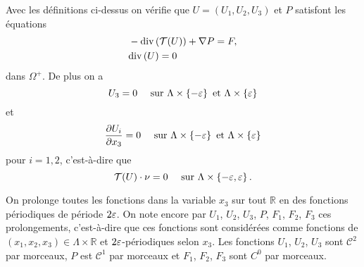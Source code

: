 Avec les définitions ci-dessus on vérifie que $U = (U_1, U_2, U_3)$ et
$P$ satisfont les équations
\begin{align}
  &-\mathrm{div}\left( \mathcal T(U) \right) + \nabla P = F,\label{eq:stokes-periodic-1}\\
  &\mathrm{div}\left( U \right) = 0\label{eq:stokes-periodic-2}
\end{align}
dans $\Omega^+$. De plus on a
\begin{equation}
U_3 = 0 \quad\text{ sur } \Lambda\times \left\{ -\varepsilon \right\} \text{ et } \Lambda\times \left\{ \varepsilon \right\}
\end{equation}
et
\begin{equation}
  \frac{\partial U_i}{\partial x_3} = 0\quad \text{ sur } \Lambda\times
  \left\{ -\varepsilon \right\} \text{ et } \Lambda\times \left\{ \varepsilon \right\}
\end{equation}
pour $i = 1,2$, c'est-à-dire que
\begin{equation}
\mathcal T(U)\cdot \nu = 0\quad \text{ sur } \Lambda\times
\left\{ -\varepsilon, \varepsilon \right\}.
\end{equation}

On prolonge toutes les fonctions dans la variable $x_3$ sur tout
$\mathbb R$ en des fonctions périodiques de période $2\varepsilon$. On
note encore par $U_1$, $U_2$, $U_3$, $P$, $F_1$, $F_2$, $F_3$ ces
prolongements, c'est-à-dire que ces fonctions sont considérées comme
fonctions de $(x_1, x_2, x_3)\in \Lambda\times \mathbb R$ et
$2\varepsilon$-périodiques selon $x_3$. Les fonctions $U_1$, $U_2$,
$U_3$ sont $\mathcal C^2$ par morceaux, $P$ est $\mathcal C^1$ par
morceaux et $F_1$, $F_2$, $F_3$ sont $C^0$ par morceaux.

